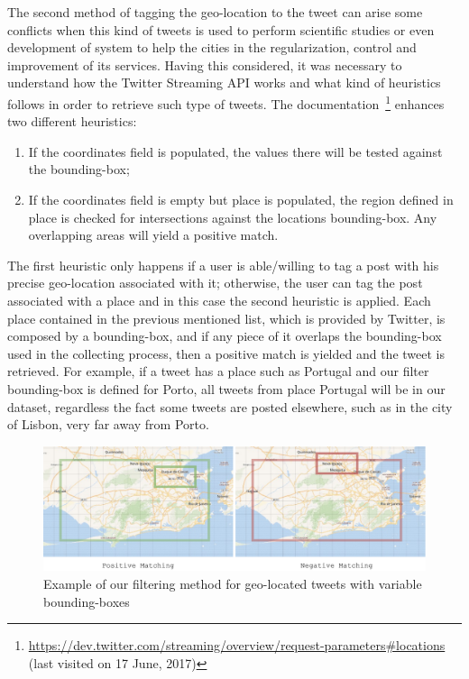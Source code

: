 The second method of tagging the geo-location to the tweet can arise some conflicts when this kind of tweets is used to perform scientific studies or even development of system to help the cities in the regularization, control and improvement of its services. Having this considered, it was necessary to understand how the Twitter Streaming API works and what kind of heuristics follows in order to retrieve such type of tweets. The documentation~\footnote{\url{https://dev.twitter.com/streaming/overview/request-parameters\#locations} (last visited on 17 June, 2017)} enhances two different heuristics:

\begin{enumerate}
	\item If the coordinates field is populated, the values there will be tested against the bounding-box;
	\item If the coordinates field is empty but place is populated, the region defined in place is checked for intersections against the locations bounding-box. Any overlapping areas will yield a positive match.
	\end{enumerate}
	
The first heuristic only happens if a user is able/willing to tag a post with his precise geo-location associated with it; otherwise, the user can tag the post associated with a place and in this case the second heuristic is applied. Each place contained in the previous mentioned list, which is provided by Twitter, is composed by a bounding-box, and if any piece of it overlaps the bounding-box used in the collecting process, then a positive match is yielded and the tweet is retrieved. For example, if a tweet has a place such as Portugal and our filter bounding-box is defined for Porto, all tweets from place Portugal will be in our dataset, regardless the fact some tweets are posted elsewhere, such as in the city of Lisbon, very far away from Porto.

\begin{figure}[!htbp]
	\centering
	\includegraphics[width=\textwidth]{figures/bounding_boxes_matching.pdf}
	\caption{Example of our filtering method for geo-located tweets with variable bounding-boxes}
	\label{fig:matching_example}
\end{figure}

